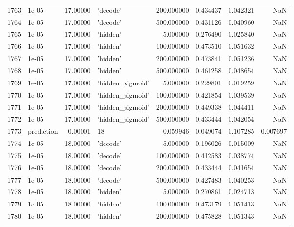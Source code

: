 \documentclass[10pt,a4paper]{article}
\begin{document}
\begin{tabular}{llrlrrrr}
1763 &       1e-05 &  17.00000 &           'decode' &  200.000000 &  0.434437 &  0.042321 &       NaN \\
1764 &       1e-05 &  17.00000 &           'decode' &  500.000000 &  0.431126 &  0.040960 &       NaN \\
1765 &       1e-05 &  17.00000 &           'hidden' &    5.000000 &  0.276490 &  0.025840 &       NaN \\
1766 &       1e-05 &  17.00000 &           'hidden' &  100.000000 &  0.473510 &  0.051632 &       NaN \\
1767 &       1e-05 &  17.00000 &           'hidden' &  200.000000 &  0.473841 &  0.051236 &       NaN \\
1768 &       1e-05 &  17.00000 &           'hidden' &  500.000000 &  0.461258 &  0.048654 &       NaN \\
1769 &       1e-05 &  17.00000 &   'hidden\_sigmoid' &    5.000000 &  0.229801 &  0.019259 &       NaN \\
1770 &       1e-05 &  17.00000 &   'hidden\_sigmoid' &  100.000000 &  0.421854 &  0.039539 &       NaN \\
1771 &       1e-05 &  17.00000 &   'hidden\_sigmoid' &  200.000000 &  0.449338 &  0.044411 &       NaN \\
1772 &       1e-05 &  17.00000 &   'hidden\_sigmoid' &  500.000000 &  0.433444 &  0.042054 &       NaN \\
1773 &  prediction &   0.00001 &                 18 &    0.059946 &  0.049074 &  0.107285 &  0.007697 \\
1774 &       1e-05 &  18.00000 &           'decode' &    5.000000 &  0.196026 &  0.015009 &       NaN \\
1775 &       1e-05 &  18.00000 &           'decode' &  100.000000 &  0.412583 &  0.038774 &       NaN \\
1776 &       1e-05 &  18.00000 &           'decode' &  200.000000 &  0.433444 &  0.041654 &       NaN \\
1777 &       1e-05 &  18.00000 &           'decode' &  500.000000 &  0.427483 &  0.040253 &       NaN \\
1778 &       1e-05 &  18.00000 &           'hidden' &    5.000000 &  0.270861 &  0.024713 &       NaN \\
1779 &       1e-05 &  18.00000 &           'hidden' &  100.000000 &  0.473179 &  0.051413 &       NaN \\
1780 &       1e-05 &  18.00000 &           'hidden' &  200.000000 &  0.475828 &  0.051343 &       NaN \\

\end{tabular}
\end{document}
